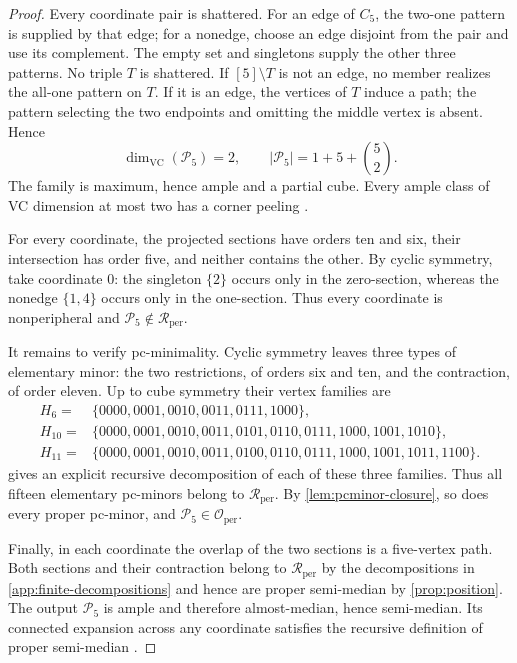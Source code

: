 \documentclass[11pt]{article}
\theoremstyle{definition}
\theoremstyle{remark}
\newcommand{\Rper}{\mathcal R_{\mathrm{per}}}
\newcommand{\Oper}{\mathcal O_{\mathrm{per}}}
\begin{document}
\begin{proof}
Every coordinate pair is shattered.  For an edge of \(C_5\), the two-one
pattern is supplied by that edge; for a nonedge, choose an edge disjoint from
the pair and use its complement.  The empty set and singletons supply the
other three patterns.  No triple \(T\) is shattered.  If \([5]\setminus T\)
is not an edge, no member realizes the all-one pattern on \(T\).  If it is
an edge, the vertices of \(T\) induce a path; the pattern selecting the two
endpoints and omitting the middle vertex is absent.  Hence
\[
 \dim_{\mathrm{VC}}(\mathcal P_5)=2,\qquad
 |\mathcal P_5|=1+5+\binom52.
\]
The family is maximum, hence ample and a partial cube.  Every ample class of
VC dimension at most two has a corner peeling
\cite[Proposition~4.11]{ChalopiChepoiMoran22}.

For every coordinate, the projected sections have orders ten and six, their
intersection has order five, and neither contains the other.  By cyclic
symmetry, take coordinate \(0\): the singleton \(\{2\}\) occurs only in the
zero-section, whereas the nonedge \(\{1,4\}\) occurs only in the one-section.
Thus every coordinate is nonperipheral and
\(\mathcal P_5\notin\Rper\).

It remains to verify pc-minimality.  Cyclic symmetry leaves three types of
elementary minor: the two restrictions, of orders six and ten, and the
contraction, of order eleven.  Up to cube symmetry their vertex families are
\begin{align*}
 H_6={}&\{0000,0001,0010,0011,0111,1000\},\\
 H_{10}={}&\{0000,0001,0010,0011,0101,0110,0111,1000,1001,1010\},\\
 H_{11}={}&\{0000,0001,0010,0011,0100,0110,0111,1000,1001,1011,1100\}.
\end{align*}
 gives an explicit recursive decomposition
of each of these three families.  Thus all fifteen elementary pc-minors
belong to \(\Rper\).  By
\cref{lem:pcminor-closure}, so does every proper pc-minor, and
\(\mathcal P_5\in\Oper\).

Finally, in each coordinate the overlap of the two sections is a
five-vertex path.  Both sections and their contraction belong to \(\Rper\)
by the decompositions in \cref{app:finite-decompositions} and hence are
proper semi-median by
\cref{prop:position}.  The output \(\mathcal P_5\) is ample and therefore
almost-median, hence semi-median.  Its connected expansion across any
coordinate satisfies the recursive definition of proper semi-median
\cite[Section~3, class~(10)]{journals/jgt/BresarIKMS02}.
\end{proof}
\end{document}
